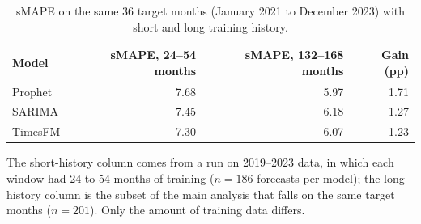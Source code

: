 \begin{table}[htbp]
\centering
\small
\caption{sMAPE on the same 36 target months (January 2021 to December 2023) with short and long training history.}
\label{tab:serie}
\begin{tabular}{lrrr}
\toprule
Model & sMAPE, 24--54 months & sMAPE, 132--168 months & Gain (pp) \\
\midrule
Prophet & 7.68 & 5.97 & 1.71 \\
SARIMA & 7.45 & 6.18 & 1.27 \\
TimesFM & 7.30 & 6.07 & 1.23 \\
\bottomrule
\end{tabular}

\vspace{0.5em}
\begin{minipage}{\textwidth}
\footnotesize
The short-history column comes from a run on 2019--2023 data, in which each window had 24 to 54 months of training ($n=186$ forecasts per model); the long-history column is the subset of the main analysis that falls on the same target months ($n=201$). Only the amount of training data differs.
\end{minipage}
\end{table}
